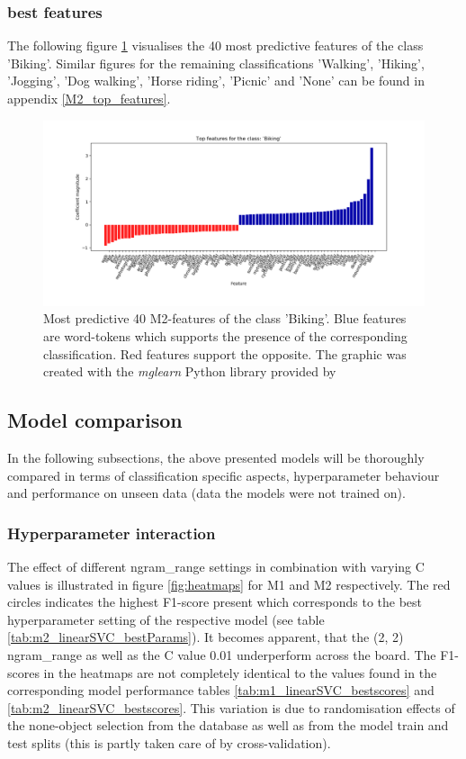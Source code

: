 \subsubsection{best features}
The following figure \ref{fig:M2_top40_features_biking} visualises the 40 most predictive features of the class 'Biking'. Similar figures for the remaining classifications 'Walking', 'Hiking', 'Jogging', 'Dog walking', 'Horse riding', 'Picnic' and 'None' can be found in appendix \ref{M2_top_features}. 
\begin{figure}[h!]
   \centering
   \includegraphics[width=\textwidth]{img/m2_top_40_features_Biking_cropped.pdf}
   \caption{Most predictive 40 M2-features of the class 'Biking'. Blue features are word-tokens which supports the presence of the corresponding classification. Red features support the opposite. The graphic was created with the \textit{mglearn} Python library provided by \parencite{Guido2016}}
   \label{fig:M2_top40_features_biking}
\end{figure}

\subsection{Model comparison}
In the following subsections, the above presented models will be thoroughly compared in terms of classification specific aspects, hyperparameter behaviour and performance on unseen data (data the models were not trained on). 

\subsubsection{Hyperparameter interaction}
The effect of different ngram\_range settings in combination with varying C values is illustrated in figure \ref{fig:heatmaps} for M1 and M2 respectively. The red circles indicates the highest F1-score present which corresponds to the best hyperparameter setting of the respective model (see table \ref{tab:m2_linearSVC_bestParams}). It becomes apparent, that the (2, 2) ngram\_range as well as the C value 0.01 underperform across the board. The F1-scores in the heatmaps are not completely identical to the values found in the corresponding model performance tables \ref{tab:m1_linearSVC_bestscores} and \ref{tab:m2_linearSVC_bestscores}. This variation is due to randomisation effects of the none-object selection from the database as well as from the model train and test splits (this is partly taken care of by cross-validation).\\

